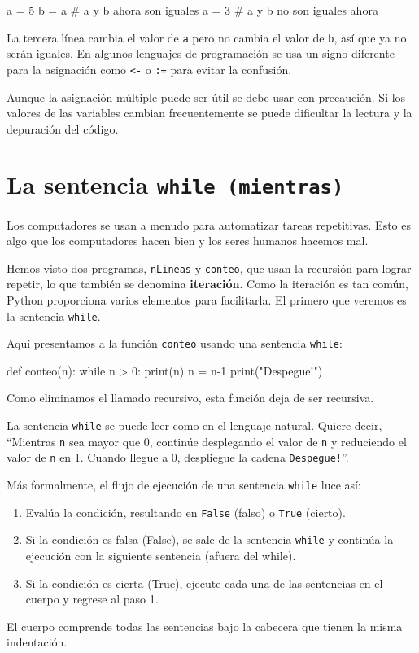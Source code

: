 \begin{pythoncode}
a = 5
b = a    # a y b ahora son iguales
a = 3    # a y b no son iguales ahora
\end{pythoncode}
 La tercera línea cambia el valor de \texttt{a} pero no cambia el
valor de \texttt{b}, así que ya no serán iguales. En algunos lenguajes
de programación se usa un signo diferente para la asignación como
\texttt{<-} o \texttt{:=} para evitar la confusión.

Aunque la asignación múltiple puede ser útil se debe usar con precaución.
Si los valores de las variables cambian frecuentemente se puede dificultar
la lectura y la depuración del código.

\section{La sentencia \texttt{while (mientras)} }

  

Los computadores se usan a menudo para automatizar tareas repetitivas.
Esto es algo que los computadores hacen bien y los seres humanos hacemos
mal.

Hemos visto dos programas, \texttt{nLineas} y \texttt{conteo}, que
usan la recursión para lograr repetir, lo que también se denomina
\textbf{iteración}. Como la iteración es tan común, Python proporciona
varios elementos para facilitarla. El primero que veremos es la sentencia
\texttt{while}.

Aquí presentamos a la función \texttt{conteo} usando una sentencia
\texttt{while}:

\begin{pythoncode}
def conteo(n):
  while n > 0:
    print(n)
    n = n-1
  print("Despegue!")
\end{pythoncode}
 Como eliminamos el llamado recursivo, esta función deja de ser recursiva.

La sentencia \texttt{while} se puede leer como en el lenguaje natural.
Quiere decir, ``Mientras \texttt{n} sea mayor que 0, continúe desplegando
el valor de \texttt{n} y reduciendo el valor de \texttt{n} en 1. Cuando
llegue a 0, despliegue la cadena \texttt{Despegue!}''.

Más formalmente, el flujo de ejecución de una sentencia \texttt{while}
luce así:
\begin{enumerate}
\item Evalúa la condición, resultando en \texttt{False} (falso) o \texttt{True}
(cierto).
\item Si la condición es falsa (False), se sale de la sentencia \texttt{while}
y continúa la ejecución con la siguiente sentencia (afuera del while).
\item Si la condición es cierta (True), ejecute cada una de las sentencias
en el cuerpo y regrese al paso 1.
\end{enumerate}
El cuerpo comprende todas las sentencias bajo la cabecera que tienen
la misma indentación.

